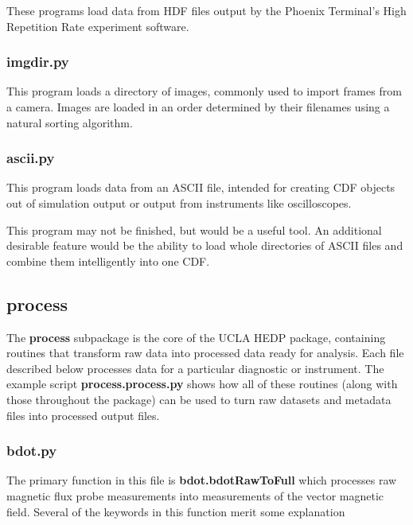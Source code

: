\documentclass[12pt]{article}
\newcommand{\loc}[1]{{\bf \fontfamily{pcr}\selectfont #1}}
\newcommand{\todo}[1]{ \begin{tcolorbox} \centering  #1 \end{tcolorbox}}
\begin{document}
These programs load data from HDF files output by the Phoenix Terminal's High Repetition Rate experiment software. 

\subsubsection{\loc{imgdir.py}}

This program loads a directory of images, commonly used to import frames from a camera. Images are loaded in an order determined by their filenames using a natural sorting algorithm.


\subsubsection{\loc{ascii.py}}

This program loads data from an ASCII file, intended for creating CDF objects out of simulation output or output from instruments like oscilloscopes. 

\todo{This program may not be finished, but would be a useful tool. An additional desirable feature would be the ability to load whole directories of ASCII files and combine them intelligently into one CDF.}


\subsection{\loc{process}}

The \loc{process} subpackage is the core of the UCLA HEDP package, containing routines that transform raw data into processed data ready for analysis. Each file described below processes data for a particular diagnostic or instrument. The example script \loc{process.process.py} shows how all of these routines (along with those throughout the package) can be used to turn raw datasets and metadata files into processed output files.

\subsubsection{\loc{bdot.py}}

The primary function in this file is \loc{bdot.bdotRawToFull} which processes raw magnetic flux probe measurements into measurements of the vector magnetic field. Several of the keywords in this function merit some explanation
\end{document}
